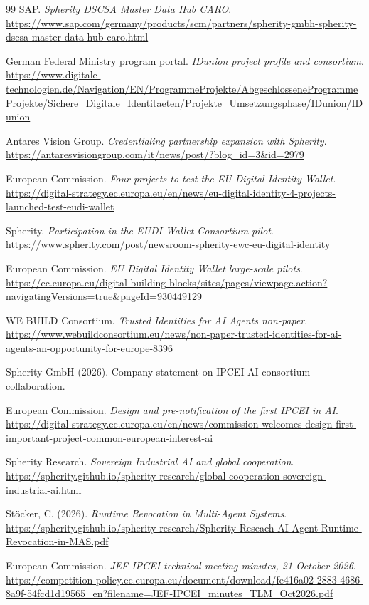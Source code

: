 \begin{thebibliography}{99}
SAP. \textit{Spherity DSCSA Master Data Hub CARO}.
\url{https://www.sap.com/germany/products/scm/partners/spherity-gmbh-spherity-dscsa-master-data-hub-caro.html}

German Federal Ministry program portal. \textit{IDunion project profile and consortium}.
\url{https://www.digitale-technologien.de/Navigation/EN/ProgrammeProjekte/AbgeschlosseneProgrammeProjekte/Sichere_Digitale_Identitaeten/Projekte_Umsetzungsphase/IDunion/IDunion}

Antares Vision Group. \textit{Credentialing partnership expansion with Spherity}.
\url{https://antaresvisiongroup.com/it/news/post/?blog_id=3&id=2979}

European Commission. \textit{Four projects to test the EU Digital Identity Wallet}.
\url{https://digital-strategy.ec.europa.eu/en/news/eu-digital-identity-4-projects-launched-test-eudi-wallet}

Spherity. \textit{Participation in the EUDI Wallet Consortium pilot}.
\url{https://www.spherity.com/post/newsroom-spherity-ewc-eu-digital-identity}

European Commission. \textit{EU Digital Identity Wallet large-scale pilots}.
\url{https://ec.europa.eu/digital-building-blocks/sites/pages/viewpage.action?navigatingVersions=true&pageId=930449129}

WE BUILD Consortium. \textit{Trusted Identities for AI Agents non-paper}.
\url{https://www.webuildconsortium.eu/news/non-paper-trusted-identities-for-ai-agents-an-opportunity-for-europe-8396}

Spherity GmbH (2026). Company statement on IPCEI-AI consortium collaboration.

European Commission. \textit{Design and pre-notification of the first IPCEI in AI}.
\url{https://digital-strategy.ec.europa.eu/en/news/commission-welcomes-design-first-important-project-common-european-interest-ai}

Spherity Research. \textit{Sovereign Industrial AI and global cooperation}.
\url{https://spherity.github.io/spherity-research/global-cooperation-sovereign-industrial-ai.html}

Stöcker, C. (2026). \textit{Runtime Revocation in Multi-Agent Systems}.
\url{https://spherity.github.io/spherity-research/Spherity-Reseach-AI-Agent-Runtime-Revocation-in-MAS.pdf}

European Commission. \textit{JEF-IPCEI technical meeting minutes, 21 October 2026}.
\url{https://competition-policy.ec.europa.eu/document/download/fe416a02-2883-4686-8a9f-54fcd1d19565_en?filename=JEF-IPCEI_minutes_TLM_Oct2026.pdf}


\end{thebibliography}
